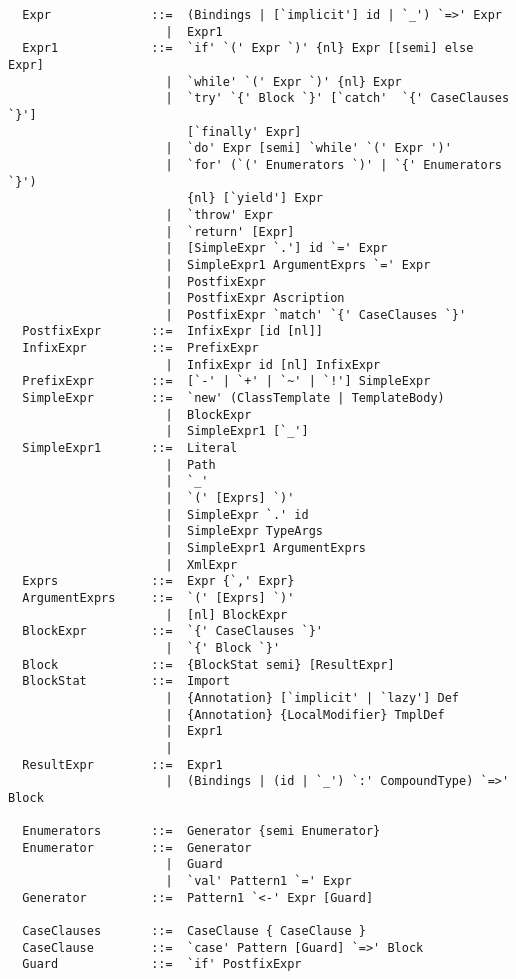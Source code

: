 {\begin{lstlisting}
  Expr              ::=  (Bindings | [`implicit'] id | `_') `=>' Expr
                      |  Expr1
  Expr1             ::=  `if' `(' Expr `)' {nl} Expr [[semi] else Expr]
                      |  `while' `(' Expr `)' {nl} Expr
                      |  `try' `{' Block `}' [`catch'  `{' CaseClauses `}'] 
                         [`finally' Expr]
                      |  `do' Expr [semi] `while' `(' Expr ')'
                      |  `for' (`(' Enumerators `)' | `{' Enumerators `}') 
                         {nl} [`yield'] Expr
                      |  `throw' Expr
                      |  `return' [Expr]
                      |  [SimpleExpr `.'] id `=' Expr
                      |  SimpleExpr1 ArgumentExprs `=' Expr
                      |  PostfixExpr
                      |  PostfixExpr Ascription
                      |  PostfixExpr `match' `{' CaseClauses `}'
  PostfixExpr       ::=  InfixExpr [id [nl]]
  InfixExpr         ::=  PrefixExpr
                      |  InfixExpr id [nl] InfixExpr
  PrefixExpr        ::=  [`-' | `+' | `~' | `!'] SimpleExpr 
  SimpleExpr        ::=  `new' (ClassTemplate | TemplateBody)
                      |  BlockExpr
                      |  SimpleExpr1 [`_']
  SimpleExpr1       ::=  Literal
                      |  Path
                      |  `_'
                      |  `(' [Exprs] `)'
                      |  SimpleExpr `.' id 
                      |  SimpleExpr TypeArgs
                      |  SimpleExpr1 ArgumentExprs
                      |  XmlExpr
  Exprs             ::=  Expr {`,' Expr}
  ArgumentExprs     ::=  `(' [Exprs] `)'
                      |  [nl] BlockExpr
  BlockExpr         ::=  `{' CaseClauses `}'
                      |  `{' Block `}'
  Block             ::=  {BlockStat semi} [ResultExpr]
  BlockStat         ::=  Import
                      |  {Annotation} [`implicit' | `lazy'] Def
                      |  {Annotation} {LocalModifier} TmplDef
                      |  Expr1
                      |
  ResultExpr        ::=  Expr1
                      |  (Bindings | (id | `_') `:' CompoundType) `=>' Block

  Enumerators       ::=  Generator {semi Enumerator}
  Enumerator        ::=  Generator
                      |  Guard
                      |  `val' Pattern1 `=' Expr
  Generator         ::=  Pattern1 `<-' Expr [Guard]

  CaseClauses       ::=  CaseClause { CaseClause }
  CaseClause        ::=  `case' Pattern [Guard] `=>' Block 
  Guard             ::=  `if' PostfixExpr


\end{lstlisting}}
